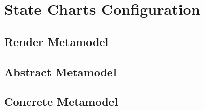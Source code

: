 \section{State Charts Configuration}
\label{app:state}
\subsection*{Render Metamodel}

\subsection*{Abstract Metamodel}

\subsection*{Concrete Metamodel}
